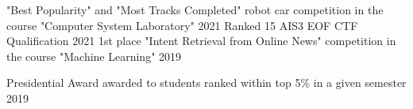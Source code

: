 




\begin{cvhonors}

  \cvhonor
    {"Best Popularity" and "Most Tracks Completed"} %
    {robot car competition in the course "Computer System Laboratory"} %
    {} %
    {2021} %
  \cvhonor
    {Ranked 15} %
    {AIS3 EOF CTF Qualification} %
    {} %
    {2021} %
  \cvhonor
    {1st place} %
    {"Intent Retrieval from Online News" competition in the course "Machine Learning"} %
    {} %
    {2019} %
    
  \cvhonor
    {Presidential Award} %
    {awarded to students ranked within top 5\% in a given semester} %
    {} %
    {2019} %

\end{cvhonors}


